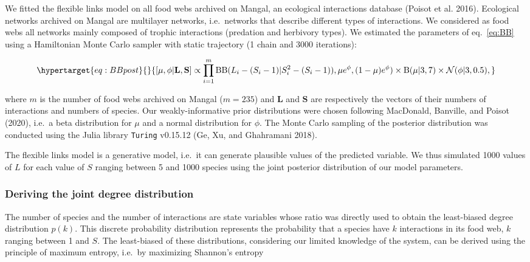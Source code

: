 \documentclass[10pt,oneside]{article}
\begin{document}
We fitted the flexible links model on all food webs archived on Mangal,
an ecological interactions database (Poisot et al. 2016). Ecological
networks archived on Mangal are multilayer networks, i.e.~networks that
describe different types of interactions. We considered as food webs all
networks mainly composed of trophic interactions (predation and
herbivory types). We estimated the parameters of eq.~\ref{eq:BB} using a
Hamiltonian Monte Carlo sampler with static trajectory (1 chain and 3000
iterations):

\begin{equation}\protect\hypertarget{eq:BBpost}{}{
[\mu, \phi| \textbf{L}, \textbf{S}] \propto \prod_{i = 1}^{m} \mathrm{BB}(L_i - (S_i - 1) | S_i^2 - (S_i - 1)), \mu e^{\phi}, (1 - \mu) e^\phi) \times \mathrm{B}(\mu| 3 , 7 ) \times \mathcal{N}(\phi | 3, 0.5),
}\label{eq:BBpost}\end{equation}

where \(m\) is the number of food webs archived on Mangal (\(m = 235\))
and \(\textbf{L}\) and \(\textbf{S}\) are respectively the vectors of
their numbers of interactions and numbers of species. Our
weakly-informative prior distributions were chosen following MacDonald,
Banville, and Poisot (2020), i.e.~a beta distribution for \(\mu\) and a
normal distribution for \(\phi\). The Monte Carlo sampling of the
posterior distribution was conducted using the Julia library
\texttt{Turing} v0.15.12 (Ge, Xu, and Ghahramani 2018).

The flexible links model is a generative model, i.e.~it can generate
plausible values of the predicted variable. We thus simulated 1000
values of \(L\) for each value of \(S\) ranging between 5 and 1000
species using the joint posterior distribution of our model parameters.

\hypertarget{deriving-the-joint-degree-distribution}{%
\subsubsection{Deriving the joint degree
distribution}\label{deriving-the-joint-degree-distribution}}

The number of species and the number of interactions are state variables
whose ratio was directly used to obtain the least-biased degree
distribution \(p(k)\). This discrete probability distribution represents
the probability that a species have \(k\) interactions in its food web,
\(k\) ranging between 1 and \(S\). The least-biased of these
distributions, considering our limited knowledge of the system, can be
derived using the principle of maximum entropy, i.e.~by maximizing
Shannon's entropy
\end{document}
